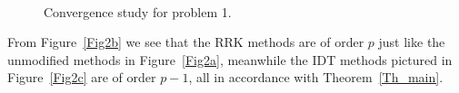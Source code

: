 \documentclass{article}
\begin{document}
    \begin{figure}[H]
        \centering
        \hfill
        \hfill\\
        \hfill
        \caption{Convergence study for problem 1.} \label{Fig2}
    \end{figure}

    From Figure~\ref{Fig2b} we see that the RRK methods are of order \(p\) just like the unmodified methods in Figure~\ref{Fig2a}, meanwhile the IDT methods pictured in Figure~\ref{Fig2c} are of order \(p-1\), all in accordance with Theorem~\ref{Th_main}.
\end{document}
